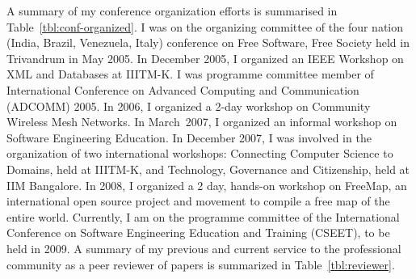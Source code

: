 \documentclass[titlepage, %
11pt, 
]{article}
\begin{document}
A summary of my conference organization efforts is
summarised in Table~\ref{tbl:conf-organized}.  I was on the
organizing committee of the four nation (India, Brazil,
Venezuela, Italy) conference on Free Software, Free Society
held in Trivandrum in May 2005.  In December 2005, I
organized an IEEE Workshop on XML and Databases at IIITM-K.
I was programme committee member of International Conference
on Advanced Computing and Communication (ADCOMM) 2005.  In
2006, I organized a 2-day workshop on Community Wireless
Mesh Networks.  In March~2007, I organized an informal
workshop on Software Engineering Education.  In December
2007, I was involved in the organization of two
international workshops: Connecting Computer Science to
Domains, held at IIITM-K, and Technology, Governance and
Citizenship, held at IIM Bangalore.  In 2008, I organized a
2 day, hands-on workshop on FreeMap, an international open
source project and movement to compile a free map of the
entire world.  Currently, I am on the programme committee of
the International Conference on Software Engineering
Education and Training (CSEET), to be held in 2009.  A
summary of my previous and current service to the
professional community as a peer reviewer of papers is
summarized in Table~\ref{tbl:reviewer}.
\end{document}

